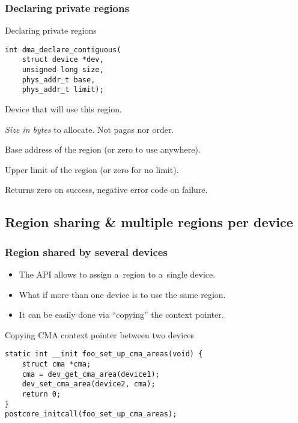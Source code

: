 \begin{frame}[fragile]
  \frametitle{Declaring private regions}

  \begin{block}{Declaring private regions}
\begin{lstlisting}
int dma_declare_contiguous(
    struct device *dev,
    unsigned long size,
    phys_addr_t base,
    phys_addr_t limit);
\end{lstlisting}
  \end{block}

  \begin{description}[count]
  \item[dev] Device that will use this region.
  \item[size] \emph{Size in bytes} to allocate. {\footnotesize Not
    pagas nor order.}
  \item[base] Base address of the region (or zero to use anywhere).
  \item[limit] Upper limit of the region (or zero for no limit).
  \item Returns zero on success, negative error code on failure.
  \end{description}
\end{frame}

\subsection{Region sharing \& multiple regions per device}

\begin{frame}[fragile]
  \frametitle{Region shared by several devices}

  \begin{itemize}
  \item The API allows to assign a~region to a~single device.
  \item What if more than one device is to use the same region.
  \item It can be easily done via “copying” the context pointer.
  \end{itemize}

  \begin{block}{Copying CMA context pointer between two devices}
\begin{lstlisting}
static int __init foo_set_up_cma_areas(void) {
    struct cma *cma;
    cma = dev_get_cma_area(device1);
    dev_set_cma_area(device2, cma);
    return 0;
}
postcore_initcall(foo_set_up_cma_areas);
\end{lstlisting}
  \end{block}
\end{frame}


